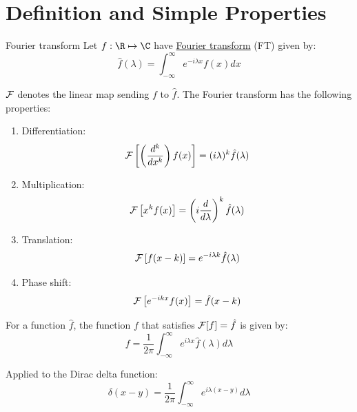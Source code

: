 \documentclass[../Main.tex]{subfiles}
\begin{document}
\section{Definition and Simple Properties}
\begin{definition}{Fourier transform}
    Let $f : \R \mapsto \C$ have \underline{Fourier transform} (FT) given by:
    \begin{equation*}
        \hat{f}(\lambda) = \int_{-\infty}^{\infty} e^{-i\lambda x}f(x) dx
    \end{equation*}
\end{definition}
$\mathcal{F}$ denotes the linear map sending $f$ to $\hat{f}$. The Fourier transform has the following properties:
\begin{enumerate}
    \item Differentiation:
        \begin{equation*}
            \mathcal{F}\left[\left(\frac{d^{k}}{dx^{k}}\right)f(x)\right] = (i\lambda)^k \hat{f}(\lambda)
        \end{equation*}
    \item Multiplication:
        \begin{equation*}
            \mathcal{F}\left[x^kf(x)\right] = \left(i \frac{d}{d\lambda}\right)^k \hat{f}(\lambda)
        \end{equation*}
    \item Translation:
        \begin{equation*}
            \mathcal{F}\left[f(x - k)\right] = e^{-i\lambda k}\hat{f}(\lambda)
        \end{equation*}
    \item Phase shift:
        \begin{equation*}
            \mathcal{F}\left[e^{-ikx} f(x)\right] = \hat{f}(x - k)
        \end{equation*}
\end{enumerate}
\begin{theorem}
    For a function $\hat{f}$, the function $f$ that satisfies $\mathcal{F}[f] = \hat{f}$ is given by:
    \begin{equation*}
        f = \frac1{2\pi} \int_{-\infty}^{\infty} e^{i\lambda x}\hat{f}(\lambda) d\lambda 
    \end{equation*}
    \label{thmFourierInversion}
\end{theorem}
Applied to the Dirac delta function:
\begin{equation*}
    \delta(x - y) = \frac{1}{2\pi} \int_{-\infty}^{\infty} e^{i\lambda(x-y)} d\lambda 
\end{equation*}
\end{document}
